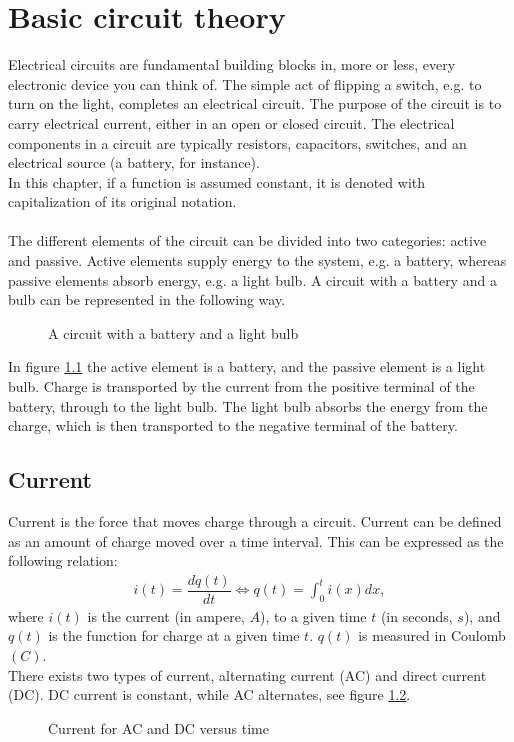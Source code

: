 \chapter{Basic circuit theory}
Electrical circuits are fundamental building blocks in, more or less, every electronic device you can think of. The simple act of flipping a switch, e.g. to turn on the light, completes an electrical circuit. The purpose of the circuit is to carry electrical current, either in an open or closed circuit. The electrical components in a circuit are typically resistors, capacitors,  switches, and an electrical 	source (a battery, for instance).
\\ 
In this chapter, if a function is assumed constant, it is denoted with capitalization of its original notation. 
\\ 
\\
The different elements of the circuit can be divided into two categories: active and passive. Active elements supply energy to the system, e.g. a battery, whereas passive elements absorb energy, e.g. a light bulb. A circuit with a battery and a bulb can be represented in the following way.
\begin{figure}[H]

\caption{A circuit with a battery and a light bulb}
\label{fig:bulb}
\end{figure} 
In figure \ref{fig:bulb} the active element is a battery, and the passive element is a light bulb. Charge is transported by the current from the positive terminal of the battery, through to the light bulb. The light bulb absorbs the energy from the charge, which is then transported to the negative terminal of the battery.
\\
\section{Current}
Current is the force that moves charge through a circuit. Current can be defined as an amount of charge moved over a time interval. This can be expressed as the following relation:
\begin{align}
i(t)=\dfrac{dq(t)}{dt} \Leftrightarrow q(t)=\int_{0}^{t}i(x)dx,
\end{align}
where $i(t)$ is the current (in ampere, $A$), to a given time $t$ (in seconds, $s$), and $q(t)$ is the function for charge at a given time $t$. $q(t)$ is measured in Coulomb$(C)$.
\\
There exists two types of current, alternating current (AC) and direct current (DC). DC current is constant, while AC alternates, see figure \ref{fig:ACDC}. 
\begin{figure}[H] 

\caption{Current for AC and DC versus time}
\label{fig:ACDC}
\end{figure}
